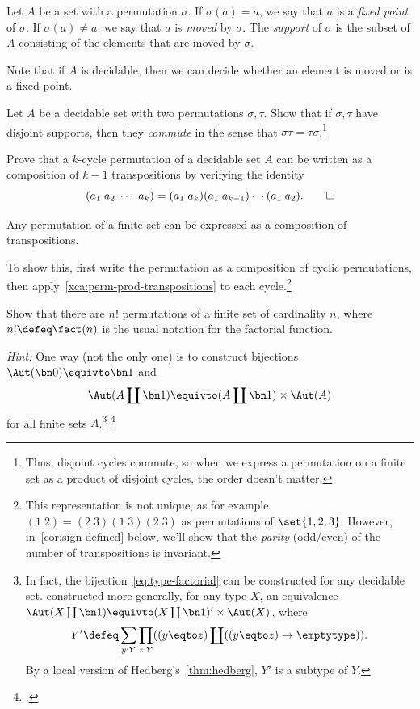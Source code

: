 \begin{definition}\label{def:support-permutation}
  Let $A$ be a set with a permutation $\sigma$.
  If $\sigma(a)=a$, we say that $a$ is a \emph{fixed point} of $\sigma$.
  If $\sigma(a)\ne a$, we say that $a$ is \emph{moved} by $\sigma$.
  The \emph{support} of $\sigma$ is the subset of $A$
  consisting of the elements that are moved by $\sigma$.
\end{definition}
Note that if $A$ is decidable, then we can decide whether an element is moved or is a fixed point.

\begin{xca}
  Let $A$ be a decidable set with two permutations $\sigma,\tau$.
  Show that if $\sigma,\tau$ have disjoint supports,
  then they \emph{commute} in the sense that $\sigma\tau=\tau\sigma$.\footnote{%
    Thus, disjoint cycles commute, so when we express a permutation
    on a finite set as a product of disjoint cycles, the order doesn't matter.}
\end{xca}
\begin{xca}\label{xca:perm-prod-transpositions}
  Prove that a $k$-cycle permutation of a decidable set $A$ can be written
  as a composition of $k-1$ transpositions by verifying the identity
  \[
    (a_1\; a_2\; \cdots\; a_k) = (a_1\; a_k)(a_1\;a_{k-1})\cdots(a_1\;a_2).
    \qedhere
  \]
\end{xca}
\begin{corollary}
  Any permutation of a finite set can be expressed as
  a composition of transpositions.
\end{corollary}
To show this, first write the permutation as a composition of cyclic permutations,
then apply~\cref{xca:perm-prod-transpositions} to each cycle.\footnote{%
  This representation is not unique, as for example $(1\;2)=(2\;3)(1\;3)(2\;3)$
  as permutations of $\set{1,2,3}$.
  However, in~\cref{cor:sign-defined} below, we'll show that
  the \emph{parity} (odd/even) of the number of transpositions is invariant.}

\begin{xca}\label{xca:factorial}
  Show that there are $n!$ permutations of a finite set of cardinality $n$, where $n! \defeq \fact(n)$ is the usual notation for the factorial function.

  \emph{Hint:} One way (not the only one) is to construct bijections
  $\Aut(\bn 0) \equivto \bn 1$ and
  \begin{equation}\label{eq:type-factorial}
    \Aut(A \coprod \bn 1) \equivto (A \coprod \bn 1) \times \Aut(A)
  \end{equation}
  for all finite sets $A$.\footnote{%
    In fact, the bijection~\eqref{eq:type-factorial}
    can be constructed for any decidable set.
    \citeauthor{EscardoFactorial}\footnotemark{} constructed more generally,
    for any type $X$, an equivalence
    $\Aut(X \coprod \bn 1) \equivto (X \coprod \bn 1)' \times \Aut(X)$,
    where
    \[
      Y' \defeq
      \sum_{y : Y}\prod_{z : Y}((y \eqto z) \coprod ((y \eqto z)\to\emptytype)).
    \]
    By a local version of Hedberg's~\cref{thm:hedberg},
    $Y'$ is a subtype of $Y$.}%
  \footcitetext{EscardoFactorial}
\end{xca}

